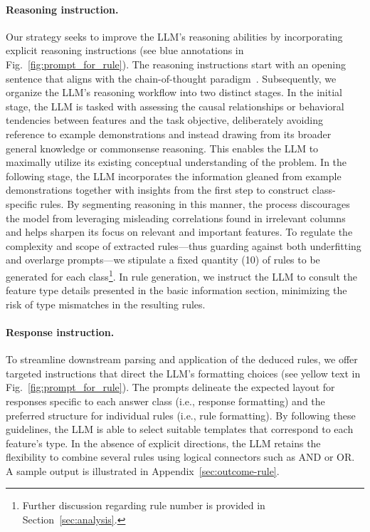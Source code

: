 \vspace*{-0.12in}
\paragraph{Reasoning instruction.} Our strategy seeks to improve the LLM's reasoning abilities by incorporating explicit reasoning instructions (see blue annotations in Fig.~\ref{fig:prompt_for_rule}). The reasoning instructions start with an opening sentence that aligns with the chain-of-thought paradigm~\cite{wei2022chain}. Subsequently, we organize the LLM's reasoning workflow into two distinct stages. In the initial stage, the LLM is tasked with assessing the causal relationships or behavioral tendencies between features and the task objective, deliberately avoiding reference to example demonstrations and instead drawing from its broader general knowledge or commonsense reasoning. This enables the LLM to maximally utilize its existing conceptual understanding of the problem. In the following stage, the LLM incorporates the information gleaned from example demonstrations together with insights from the first step to construct class-specific rules. By segmenting reasoning in this manner, the process discourages the model from leveraging misleading correlations found in irrelevant columns and helps sharpen its focus on relevant and important features. To regulate the complexity and scope of extracted rules—thus guarding against both underfitting and overlarge prompts—we stipulate a fixed quantity (10) of rules to be generated for each class\footnote{Further discussion regarding rule number is provided in Section~\ref{sec:analysis}.}. In rule generation, we instruct the LLM to consult the feature type details presented in the basic information section, minimizing the risk of type mismatches in the resulting rules.

\vspace*{-0.12in}
\paragraph{Response instruction.} To streamline downstream parsing and application of the deduced rules, we offer targeted instructions that direct the LLM’s formatting choices (see yellow text in Fig.~\ref{fig:prompt_for_rule}). The prompts delineate the expected layout for responses specific to each answer class (i.e., response formatting) and the preferred structure for individual rules (i.e., rule formatting). By following these guidelines, the LLM is able to select suitable templates that correspond to each feature’s type. In the absence of explicit directions, the LLM retains the flexibility to combine several rules using logical connectors such as AND or OR. A sample output is illustrated in Appendix~\ref{sec:outcome-rule}.

